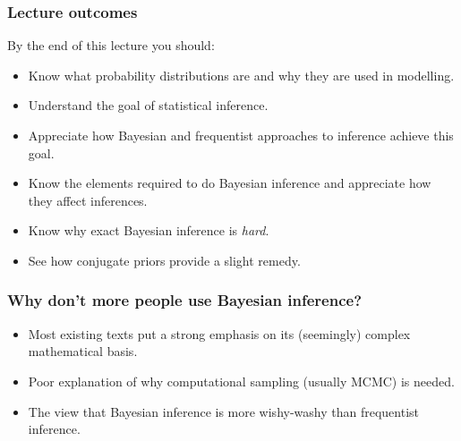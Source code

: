 \documentclass[handout]{beamer}
\begin{document}
\begin{frame}
	\frametitle{Lecture outcomes}
	By the end of this lecture you should:
	
	\begin{itemize}
		\item Know what probability distributions are and why they are used in modelling.
		\item Understand the goal of statistical inference.
		\item Appreciate how Bayesian and frequentist approaches to inference achieve this goal.
		\item Know the elements required to do Bayesian inference and appreciate how they affect inferences.
		\item Know why exact Bayesian inference is \textit{hard}.
		\item See how conjugate priors provide a slight remedy.
	\end{itemize}
	
\end{frame}

\begin{frame}
	\frametitle{Why don't more people use Bayesian inference?}
	
	\begin{itemize}
		\item<2-> Most existing texts put a strong emphasis on its (seemingly) complex mathematical basis.
		\item<3-> Poor explanation of why computational sampling (usually MCMC) is needed.
		\item<5-> The view that Bayesian inference is more wishy-washy than frequentist inference. 
	\end{itemize}
\end{frame}
\end{document}
